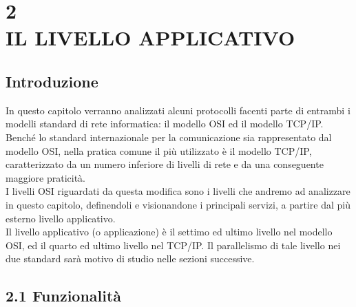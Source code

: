 \documentclass{report}%
\theoremstyle{plain}
\begin{document}
\chapter*{2\\IL LIVELLO APPLICATIVO} 

\section*{Introduzione}

In questo capitolo verranno analizzati alcuni protocolli facenti parte di entrambi i modelli standard di rete informatica: il modello OSI ed il modello TCP/IP. \\
Benché lo standard internazionale per la comunicazione sia rappresentato dal modello OSI, nella pratica comune il più utilizzato è il modello TCP/IP, caratterizzato da un numero inferiore di livelli di rete e da una conseguente maggiore praticità. \\
I livelli OSI riguardati da questa modifica sono i livelli che andremo ad analizzare in questo capitolo, definendoli e visionandone i principali servizi, a partire dal più esterno livello applicativo.\\
Il livello applicativo (o applicazione) è il settimo ed ultimo livello nel modello OSI, ed il quarto ed ultimo livello nel TCP/IP. Il parallelismo di tale livello nei due standard sarà motivo di studio nelle sezioni successive.

\section*{2.1 Funzionalità}
\end{document}
